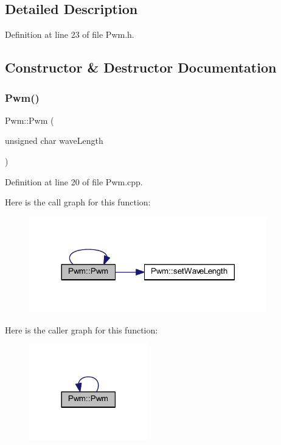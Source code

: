 \subsection{Detailed Description}


Definition at line 23 of file Pwm.\+h.



\subsection{Constructor \& Destructor Documentation}
\mbox{\label{class_pwm_af73e0bd2862428ffc7feebc0c11de5dd}} 
\subsubsection{\texorpdfstring{Pwm()}{Pwm()}}
{\footnotesize\ttfamily Pwm\+::\+Pwm (\begin{DoxyParamCaption}\item[{unsigned char}]{wave\+Length }\end{DoxyParamCaption})}



Definition at line 20 of file Pwm.\+cpp.

Here is the call graph for this function\+:
\nopagebreak
\begin{figure}[H]
\begin{center}
\leavevmode
\includegraphics[width=293pt]{d6/df6/class_pwm_af73e0bd2862428ffc7feebc0c11de5dd_cgraph}
\end{center}
\end{figure}
Here is the caller graph for this function\+:
\nopagebreak
\begin{figure}[H]
\begin{center}
\leavevmode
\includegraphics[width=146pt]{d6/df6/class_pwm_af73e0bd2862428ffc7feebc0c11de5dd_icgraph}
\end{center}
\end{figure}
\mbox{\label{class_pwm_ac97d5b9a021ea218147206706e368a22}} 
